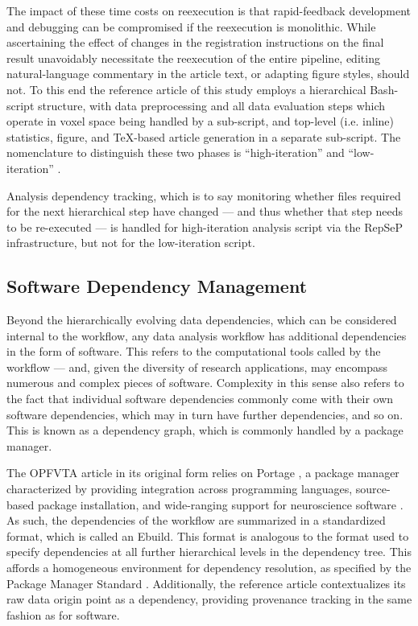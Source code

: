 The impact of these time costs on reexecution is that rapid-feedback development and debugging can be compromised if the reexecution is monolithic.
While ascertaining the effect of changes in the registration instructions on the final result unavoidably necessitate the reexecution of the entire pipeline, editing natural-language commentary in the article text, or adapting figure styles, should not.
To this end the reference article of this study employs a hierarchical Bash-script structure, with data preprocessing and all data evaluation steps which operate in voxel space being handled by a sub-script, and top-level (i.e. inline) statistics, figure, and TeX-based article generation in a separate sub-script.
The nomenclature to distinguish these two phases is “high-iteration” and “low-iteration” \supercite{repsep}.

Analysis dependency tracking, which is to say monitoring whether files required for the next hierarchical step have changed — and thus whether that step needs to be re-executed — is handled for high-iteration analysis script via the RepSeP infrastructure, but not for the low-iteration script.


\subsection{Software Dependency Management}

Beyond the hierarchically evolving data dependencies, which can be considered internal to the workflow, any data analysis workflow has additional dependencies in the form of software.
This refers to the computational tools called by the workflow — and, given the diversity of research applications, may encompass numerous and complex pieces of software.
Complexity in this sense also refers to the fact that individual software dependencies commonly come with their own software dependencies, which may in turn have further dependencies, and so on.
This is known as a dependency graph, which is commonly handled by a package manager.

The OPFVTA article in its original form relies on Portage \supercite{portage}, a package manager characterized by providing integration across programming languages, source-based package installation, and wide-ranging support for neuroscience software \supercite{ng}.
As such, the dependencies of the workflow are summarized in a standardized format, which is called an Ebuild.
This format is analogous to the format used to specify dependencies at all further hierarchical levels in the dependency tree.
This affords a homogeneous environment for dependency resolution, as specified by the Package Manager Standard \supercite{pms}.
Additionally, the reference article contextualizes its raw data origin point as a dependency, providing provenance tracking in the same fashion as for software.

